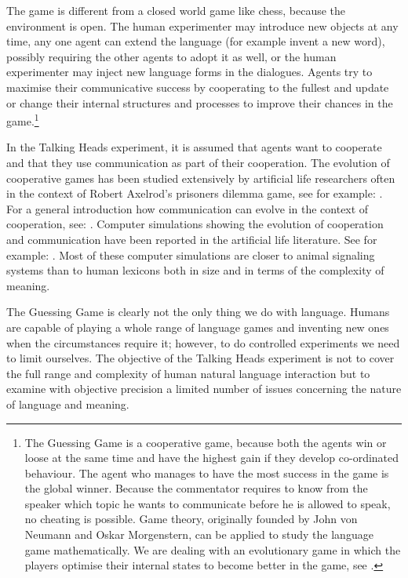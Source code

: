 The game is different from a closed world game like 
chess, because the environment is open. The human 
experimenter may introduce new objects at any
time, any one agent can extend
the language (for example invent a new word), possibly
requiring the other agents to adopt it as well, or the
human experimenter may inject new language forms in the 
dialogues. Agents try to maximise their communicative 
success by cooperating to the fullest and update or change
their internal structures and processes
to improve their chances in the game.\footnote{
The Guessing Game is a cooperative game, because
both the agents win or loose at the same time and have 
the highest gain if they develop co-ordinated behaviour. 
The agent who manages to have the most success in the game is 
the global winner. Because the commentator requires to know 
from the speaker which topic he wants to communicate 
before he is allowed to speak, no cheating 
is possible. Game theory, originally founded by John 
von Neumann and Oskar Morgenstern, can be applied to study the 
language game mathematically.  We are dealing with an 
evolutionary game in which the players optimise their 
internal states to become better in the game, see
\cite{Maynard:1982}.}

In the Talking Heads experiment, it is assumed that 
agents want to cooperate and that they use communication
as part of their cooperation. 
The evolution of cooperative games has been studied 
extensively by artificial life researchers often 
in the context of Robert Axelrod's prisoners dilemma game, 
see for example: \cite{Ikegami:1994}.  
For a general introduction how communication can 
evolve in the context of cooperation, see: \cite{Hauser:1996}. 
Computer simulations showing the evolution of 
cooperation and communication have been reported in the
artificial life literature. See for example: \cite{MacLennan:1991}. 
Most of these computer simulations are 
closer to animal signaling systems than to human lexicons
both in size and in terms of the complexity of meaning.

The Guessing Game is clearly not the only thing we do 
with language. Humans are capable of playing a whole 
range of language games and inventing
new ones when the circumstances
require it; however, to do controlled experiments we need
to limit ourselves. The objective of the Talking Heads
experiment is not to cover the full range and complexity
of human natural language interaction but to examine with
objective precision a limited number of issues concerning
the nature of language and meaning. 

